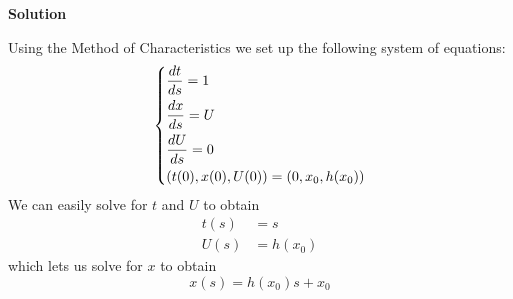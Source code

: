\documentclass{article}
\begin{document}
\textbf{Solution}

Using the Method of Characteristics we set up the following system of
equations:
%
\begin{equation*}
    \begin{dcases}
        \frac{d t}{d s} = 1 \\
        \frac{d x}{d s} = U \\
        \frac{d U}{d s} = 0 \\
        \left( t(0), x(0), U(0)\right) = \left( 0, x_ 0, h(x_0) \right)
    \end{dcases}
\end{equation*}
%
We can easily solve for $t$ and $U$ to obtain
%
\begin{align*}
    t(s) &= s \\
    U(s) &= h(x_0)
\end{align*}
%
which lets us solve for $x$ to obtain
%
\begin{equation*}
    x(s) = h(x_0) s + x_0
\end{equation*}
\end{document}
